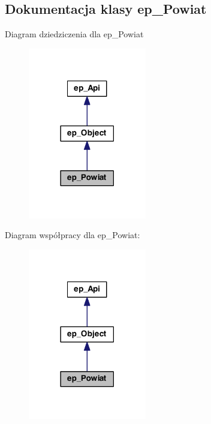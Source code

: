 \hypertarget{classep___powiat}{\subsection{Dokumentacja klasy ep\-\_\-\-Powiat}
\label{classep___powiat}
}


Diagram dziedziczenia dla ep\-\_\-\-Powiat\nopagebreak
\begin{figure}[H]
\begin{center}
\leavevmode
\includegraphics[width=146pt]{classep___powiat__inherit__graph}
\end{center}
\end{figure}


Diagram współpracy dla ep\-\_\-\-Powiat\-:\nopagebreak
\begin{figure}[H]
\begin{center}
\leavevmode
\includegraphics[width=146pt]{classep___powiat__coll__graph}
\end{center}
\end{figure}
